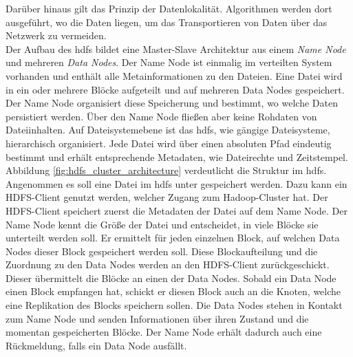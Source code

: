 \noindent
Darüber hinaus gilt das Prinzip der Datenlokalität. Algorithmen werden dort ausgeführt, wo die Daten liegen, um das Transportieren von Daten über das Netzwerk zu vermeiden.\cite{hdfs_architecture}\\

\noindent
Der Aufbau des \gls{hdfs} bildet eine Master-Slave Architektur aus einem \textit{Name Node} und mehreren \textit{Data Nodes}. Der Name Node ist einmalig im verteilten System vorhanden und enthält alle Metainformationen zu den Dateien. Eine Datei wird in ein oder mehrere Blöcke aufgeteilt und auf mehreren Data Nodes gespeichert. Der Name Node organisiert diese Speicherung und bestimmt, wo welche Daten persistiert werden. Über den Name Node fließen aber keine Rohdaten von Dateiinhalten. Auf Dateisystemebene ist das \gls{hdfs}, wie gängige Dateisysteme, hierarchisch organisiert. Jede Datei wird über einen absoluten Pfad eindeutig bestimmt und erhält entsprechende Metadaten, wie Dateirechte und Zeitstempel.  \\

\noindent
Abbildung \ref{fig:hdfs_cluster_architecture} verdeutlicht die Struktur im \gls{hdfs}. Angenommen es soll eine Datei im \gls{hdfs} unter  gespeichert werden. Dazu kann ein HDFS-Client genutzt werden, welcher Zugang zum Hadoop-Cluster hat. Der HDFS-Client speichert zuerst die Metadaten der Datei auf dem Name Node. Der Name Node kennt die Größe der Datei und entscheidet, in viele Blöcke sie unterteilt werden soll. Er ermittelt für jeden einzelnen Block, auf welchen Data Nodes dieser Block gespeichert werden soll. Diese Blockaufteilung und die Zuordnung zu den Data Nodes werden an den HDFS-Client zurückgeschickt. Dieser übermittelt die Blöcke an einen der Data Nodes. Sobald ein Data Node einen Block empfangen hat, schickt er diesen Block auch an die Knoten, welche eine Replikation des Blocks speichern sollen. Die Data Nodes stehen in Kontakt zum Name Node und senden Informationen über ihren Zustand und die momentan gespeicherten Blöcke. Der Name Node erhält dadurch auch eine Rückmeldung, falls ein Data Node ausfällt.

